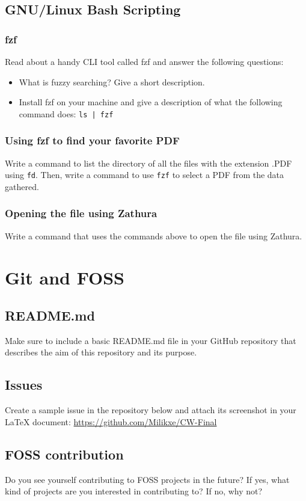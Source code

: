 \documentclass{article}
\begin{document}
\subsection{GNU/Linux Bash Scripting}
\subsubsection{fzf}
Read about a handy CLI tool called fzf and answer the following questions:
\begin{itemize}
    \item What is fuzzy searching? Give a short description.
    \item Install fzf on your machine and give a description of what the following command does: \texttt{ls | fzf}
\end{itemize}

\subsubsection{Using fzf to find your favorite PDF}
Write a command to list the directory of all the files with the extension .PDF using \texttt{fd}. Then, write a command to use \texttt{fzf} to select a PDF from the data gathered.

\subsubsection{Opening the file using Zathura}
Write a command that uses the commands above to open the file using Zathura.

\section{Git and FOSS}
\subsection{README.md}
Make sure to include a basic README.md file in your GitHub repository that describes the aim of this repository and its purpose.

\subsection{Issues}
Create a sample issue in the repository below and attach its screenshot in your LaTeX document:
\url{https://github.com/Milikxe/CW-Final}

\subsection{FOSS contribution}
Do you see yourself contributing to FOSS projects in the future? If yes, what kind of projects are you interested in contributing to? If no, why not?
\end{document}
